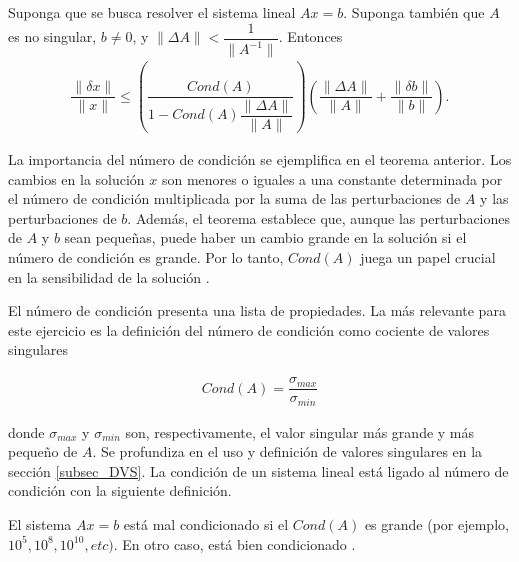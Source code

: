 \begin{theorem} \label{teo:perturbaciones}
	\cite[p.~65]{numerical_linear_algebra} Suponga que se busca resolver el sistema lineal $Ax = b$. Suponga también que $A$ es no singular, $b \neq 0$, y $\parallel \Delta A \parallel < \dfrac{1}{\parallel A^{-1} \parallel}$. 
	Entonces
	\begin{equation*}
		\begin{aligned}
			\dfrac{\parallel \delta x \parallel}{\parallel x \parallel} \leq \left (\dfrac{Cond(A)}{1 - Cond(A) \dfrac{\parallel \Delta A \parallel}{\parallel A \parallel}} \right) \left(\dfrac{\parallel \Delta A \parallel}{\parallel A \parallel} + \dfrac{\parallel \delta b \parallel}{\parallel b \parallel} \right ).
		\end{aligned}
	\end{equation*} 
\end{theorem}

La importancia del número de condición se ejemplifica en el teorema anterior. Los cambios en la solución $x$ son menores o iguales a una constante determinada por el número de condición multiplicada por la suma de las perturbaciones de $A$ y las perturbaciones de $b$. Además, el teorema establece que, aunque las perturbaciones de $A$ y $b$ sean pequeñas, puede haber un cambio grande en la solución si el número de condición es grande. Por lo tanto, $Cond(A)$ juega un papel crucial en la sensibilidad de la solución \citep{numerical_linear_algebra}. 

El número de condición presenta una lista de propiedades. La más relevante para este ejercicio es la definición del número de condición como cociente de valores singulares

\begin{equation} \label{formula:num_cond}
	\begin{aligned}
		Cond(A) = \dfrac{\sigma_{max}}{\sigma_{min}}
	\end{aligned}
\end{equation}

\noindent donde $\sigma_{max}$ y $\sigma_{min}$ son, respectivamente, el valor singular más grande y más pequeño de $A$. Se profundiza en el uso y definición de valores singulares en la sección \ref{subsec_DVS}. La condición de un sistema lineal está ligado al número de condición con la siguiente definición. 

\begin{definition} \label{def:condicionamiento}
	El sistema $Ax = b$ está mal condicionado si el $Cond(A)$ es grande (por ejemplo, $10^{5}, 10^{8}, 10^{10}, etc)$. En otro caso, está bien condicionado \cite[p.~68]{numerical_linear_algebra}.
\end{definition}

